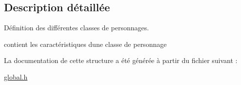 \subsection{Description détaillée}
Définition des différentes classes de personnages. 

contient les caractéristiques d\textquotesingle{}une classe de personnage 

La documentation de cette structure a été générée à partir du fichier suivant \+:\begin{DoxyCompactItemize}
\item 
\hyperlink{a00021}{global.\+h}\end{DoxyCompactItemize}
